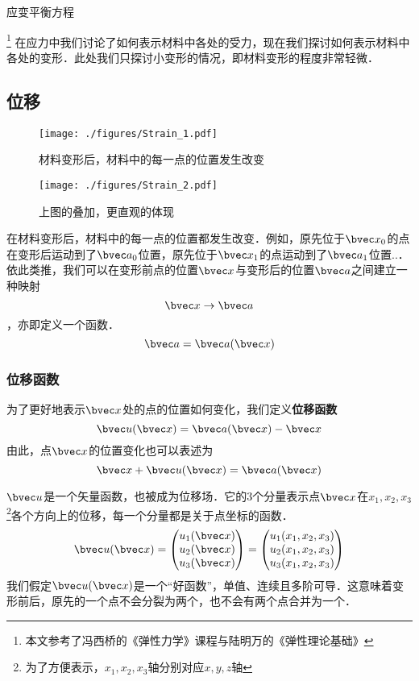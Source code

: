 
\begin{issues}
\issueTODO 
应变平衡方程
\end{issues}

\footnote{本文参考了冯西桥的《弹性力学》课程与陆明万的《弹性理论基础》}
在应力中我们讨论了如何表示材料中各处的受力，现在我们探讨如何表示材料中各处的变形．此处我们只探讨小变形的情况，即材料变形的程度非常轻微．
\subsection{位移}
\begin{figure}[ht]
\centering
\texttt{[image: ./figures/Strain\_1.pdf]}
\caption{材料变形后，材料中的每一点的位置发生改变} \label{Strain_fig1}
\end{figure}
\begin{figure}[ht]
\centering
\texttt{[image: ./figures/Strain\_2.pdf]}
\caption{上图的叠加，更直观的体现} \label{Strain_fig2}
\end{figure}

在材料变形后，材料中的每一点的位置都发生改变．例如，原先位于$\bvec x_0$的点在变形后运动到了$\bvec a_0$位置，原先位于$\bvec x_1$的点运动到了$\bvec a_1$位置..．依此类推，我们可以在变形前点的位置$\bvec x$与变形后的位置$\bvec a$之间建立一种映射$$\bvec x\rightarrow \bvec a$$，亦即定义一个函数．$$\bvec a = \bvec a (\bvec x)$$

\subsubsection{位移函数}
为了更好地表示$\bvec x$处的点的位置如何变化，我们定义\textbf{位移函数}
\begin{equation}
\bvec u (\bvec x) =\bvec a (\bvec x) - \bvec x
\end{equation}
由此，点$\bvec x$的位置变化也可以表述为
\begin{equation}
\bvec x + \bvec u (\bvec x) =\bvec a (\bvec x) 
\end{equation}

$\bvec u$是一个矢量函数，也被成为位移场．它的3个分量表示点$\bvec x$在$x_1, x_2, x_3$\footnote{为了方便表示，$x_1, x_2, x_3$轴分别对应$x,y,z$轴}各个方向上的位移，每一个分量都是关于点坐标的函数．
$$\bvec u(\bvec x) = 
\begin{pmatrix}
u_1(\bvec x)\\
u_2(\bvec x)\\
u_3(\bvec x)\\
\end{pmatrix}
=
\begin{pmatrix}
u_1(x_1, x_2, x_3)\\
u_2(x_1, x_2, x_3)\\
u_3(x_1, x_2, x_3)\\
\end{pmatrix}
$$
我们假定$\bvec u(\bvec x)$是一个“好函数”，单值、连续且多阶可导．这意味着变形前后，原先的一个点不会分裂为两个，也不会有两个点合并为一个．

